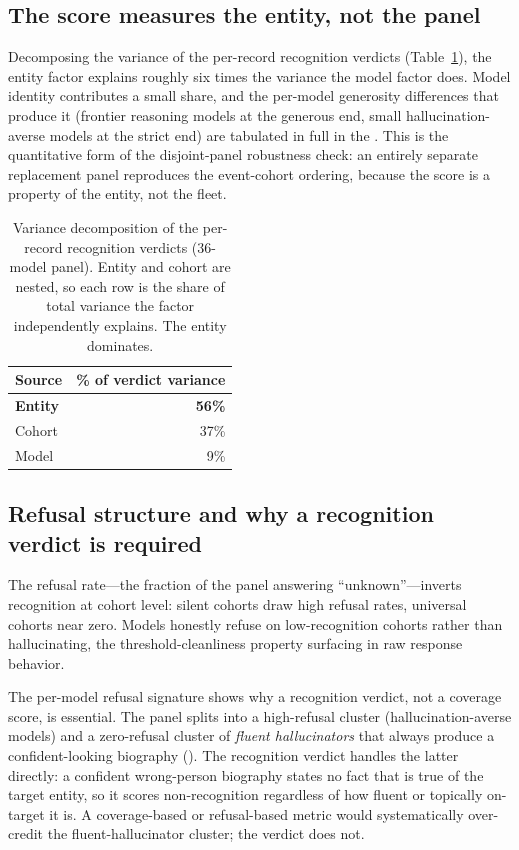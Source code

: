 \subsection{The score measures the entity, not the panel}

Decomposing the variance of the per-record recognition verdicts (Table~\ref{tab:variance}), the entity factor explains roughly six times the variance the model factor does. Model identity contributes a small share, and the per-model generosity differences that produce it (frontier reasoning models at the generous end, small hallucination-averse models at the strict end) are tabulated in full in the . This is the quantitative form of the disjoint-panel robustness check: an entirely separate replacement panel reproduces the event-cohort ordering, because the score is a property of the entity, not the fleet.

\begin{table}[!htbp]
\centering
\small
\caption{Variance decomposition of the per-record recognition verdicts ($36$-model panel). Entity and cohort are nested, so each row is the share of total variance the factor independently explains. The entity dominates.}
\label{tab:variance}
\begin{tabular}{lr}
\toprule
Source & \% of verdict variance \\
\midrule
\textbf{Entity} & \textbf{56\%} \\
Cohort & 37\% \\
Model & 9\% \\
\bottomrule
\end{tabular}
\end{table}

\subsection{Refusal structure and why a recognition verdict is required}

The refusal rate---the fraction of the panel answering ``unknown''---inverts recognition at cohort level: silent cohorts draw high refusal rates, universal cohorts near zero. Models honestly refuse on low-recognition cohorts rather than hallucinating, the threshold-cleanliness property surfacing in raw response behavior.

The per-model refusal signature shows why a recognition verdict, not a coverage score, is essential. The panel splits into a high-refusal cluster (hallucination-averse models) and a zero-refusal cluster of \emph{fluent hallucinators} that always produce a confident-looking biography (). The recognition verdict handles the latter directly: a confident wrong-person biography states no fact that is true of the target entity, so it scores non-recognition regardless of how fluent or topically on-target it is. A coverage-based or refusal-based metric would systematically over-credit the fluent-hallucinator cluster; the verdict does not.

